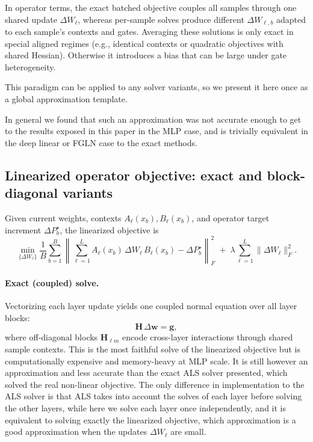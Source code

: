 \documentclass{article}
\begin{document}
In operator terms, the exact batched objective couples all samples through one
shared update $\Delta W_\ell$, whereas per-sample solves produce different
$\Delta W_{\ell,b}$ adapted to each sample's contexts and gates. Averaging these
solutions is only exact in special aligned regimes (e.g., identical contexts or
quadratic objectives with shared Hessian). Otherwise it introduces a bias that
can be large under gate heterogeneity.

This paradigm can be applied to any solver variants, so we present it here once
as a global approximation template.

In general we found that such an approximation was not accurate enough to get to the results exposed in this paper in the MLP case, and is trivially equivalent in the deep linear or FGLN case to the exact methods.

\subsection{Linearized operator objective: exact and block-diagonal variants}
\label{app:linobj}

Given current weights, contexts $A_\ell(x_b),B_\ell(x_b)$, and operator target
increment $\Delta P_b^\star$, the linearized objective is
\[
\min_{\{\Delta W_\ell\}}
\frac1B\sum_{b=1}^B
\left\|
\sum_{\ell=1}^L A_\ell(x_b)\,\Delta W_\ell\,B_\ell(x_b)-\Delta P_b^\star
\right\|_F^2
\;+\;
\lambda\sum_{\ell=1}^L \|\Delta W_\ell\|_F^2.
\]

\paragraph{Exact (coupled) solve.}
Vectorizing each layer update yields one coupled normal equation over all
layer blocks:
\[
\mathbf H\,\Delta \mathbf w = \mathbf g,
\]
where off-diagonal blocks $\mathbf H_{\ell m}$ encode cross-layer interactions
through shared sample contexts. This is the most faithful solve of the linearized
objective but is computationally expensive and memory-heavy at MLP scale. It is still however an approximation and less accurate than the exact ALS solver presented, which solved the real non-linear objective. The only difference in implementation to the ALS solver is that ALS takes into account the solves of each layer before solving the other layers, while here we solve each layer once independently, and it is equivalent to solving exactly the linearized objective, which approximation is a good approximation when the updates $\Delta W_\ell$ are small.
\end{document}
